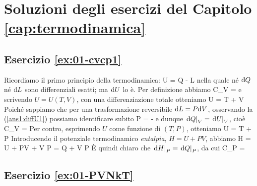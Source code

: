 \chapter{Soluzioni degli esercizi del Capitolo \ref{cap:termodinamica}}

%
%
\section*{Esercizio \ref{ex:01-cvcp1}}

Ricordiamo il primo principio della termodinamica:
\be
\label{ans1:primo}
\de U = \de Q - \de L
\ee
nella quale né ${\textrm d}Q$ né ${\textrm d}L$ sono differenziali esatti; ma ${\textrm d}U$ lo è. Per definizione abbiamo
\be
C_V = 
\ee
e scrivendo $U = U(T,V)$, con una differenziazione totale otteniamo
\be
\label{ans1:diffU1}
\de U = \de T + \de V
\ee
Poiché sappiamo che per una trasformazione reversibile ${\textrm d}L = P{\textrm d}V$, osservando la (\ref{ans1:diffU1}) possiamo identificare subito
\be
P = -
\ee
e dunque $\left.{\textrm d}Q\right|_V = \left.{\textrm d}U\right|_V$, cioè
\be
C_V = 
\ee
Per contro, esprimendo $U$ come funzione di $(T,P)$, otteniamo
\be
\label{ans1:diffU1}
\de U = \de T + \de P
\ee
Introducendo il potenziale termodinamico {\em entalpia}, $H = U + PV$, abbiamo
\be
\de H = \de U + P\de V + V \de P = \de Q + V \de P
\ee
È quindi chiaro che $\left.{\textrm d}H\right|_P = \left.{\textrm d}Q\right|_P$, da cui
\be
C_P = 
\ee

%
%
\section*{Esercizio \ref{ex:01-PVNkT}}

